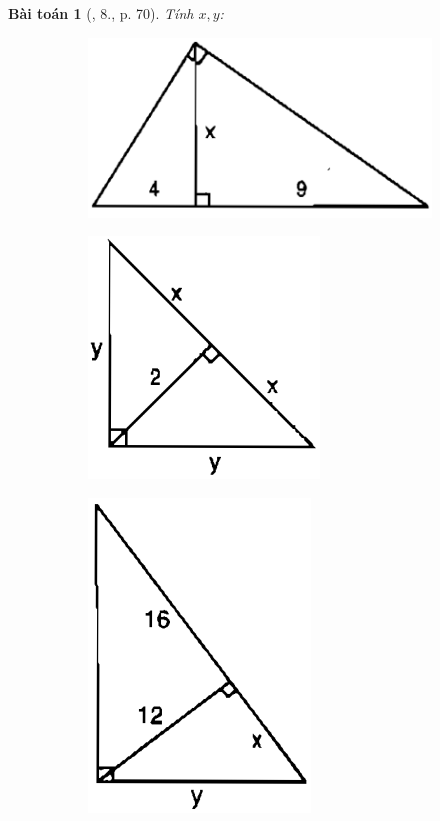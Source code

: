 \documentclass{article}
\newtheorem{baitoan}{Bài toán}
\begin{document}
\begin{baitoan}[\cite{SGK_Toan_9_tap_1}, 8., p. 70]
	Tính $x,y$:
	\begin{figure}[H]
		\centering
		\begin{subfigure}[H]{0.3\textwidth}
			\centering
			\includegraphics[scale=0.25]{SGK_Toan_9_10_p70}
		\end{subfigure}
		\begin{subfigure}[H]{0.3\textwidth}
			\centering
			\includegraphics[scale=0.25]{SGK_Toan_9_11_p70}
		\end{subfigure}
		\begin{subfigure}[H]{0.3\textwidth}
			\centering
			\includegraphics[scale=0.2]{SGK_Toan_9_12_p70}
		\end{subfigure}
	\end{figure}
\end{baitoan}
\end{document}
